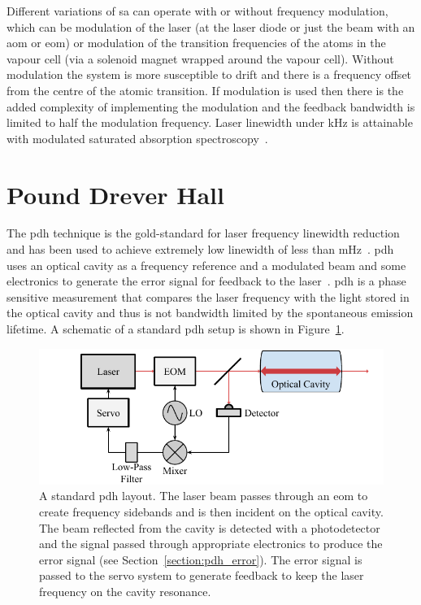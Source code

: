 Different variations of \gls{sa} can operate with or without frequency modulation, which can be modulation of the laser (at the laser diode or just the beam with an \gls{aom} or \gls{eom}) or modulation of the transition frequencies of the atoms in the vapour cell (via a solenoid magnet wrapped around the vapour cell).
Without modulation the system is more susceptible to drift and there is a frequency offset from the centre of the atomic transition.
If modulation is used then there is the added complexity of implementing the modulation and the feedback bandwidth is limited to half the modulation frequency.
Laser linewidth under \unit[150]{kHz} is attainable with modulated saturated absorption spectroscopy~\cite{saliba_linewidths_2009}.

\section{Pound Drever Hall}
The \gls{pdh} technique is the gold-standard for laser frequency linewidth reduction and has been used to achieve extremely low linewidth of less than \unit[40]{mHz}~\cite{kessler_sub-40-mhz-linewidth_2012}.
\Gls{pdh} uses an optical cavity as a frequency reference and a modulated beam and some electronics to generate the error signal for feedback to the laser~\cite{drever_laser_1983,black_introduction_2001}.
\Gls{pdh} is a phase sensitive measurement that compares the laser frequency with the light stored in the optical cavity and thus is not bandwidth limited by the spontaneous emission lifetime.
A schematic of a standard \gls{pdh} setup is shown in Figure~\ref{figure:pdh_schematic}.

\begin{figure}
\centering
\includegraphics{part1/Figs/PDH.pdf}
\caption[Pound-Drever-Hall frequency stabilisation setup.]{A standard \gls{pdh} layout.
The laser beam passes through an \gls{eom} to create frequency sidebands and is then incident on the optical cavity.
The beam reflected from the cavity is detected with a photodetector and the signal passed through appropriate electronics to produce the error signal (see Section~\ref{section:pdh_error}).
The error signal is passed to the servo system to generate feedback to keep the laser frequency on the cavity resonance.}
\label{figure:pdh_schematic}
\end{figure}

